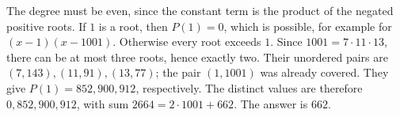 The degree must be even, since the constant term is the product of the negated positive roots. If $1$ is a root, then $P(1)=0$, which is possible, for example for $(x-1)(x-1001)$. Otherwise every root exceeds $1$. Since $1001=7\cdot11\cdot13$, there can be at most three roots, hence exactly two. Their unordered pairs are $(7,143),(11,91),(13,77)$; the pair $(1,1001)$ was already covered. They give $P(1)=852,900,912$, respectively. The distinct values are therefore $0,852,900,912$, with sum $2664=2\cdot1001+662$. The answer is $\boxed{662}$.
